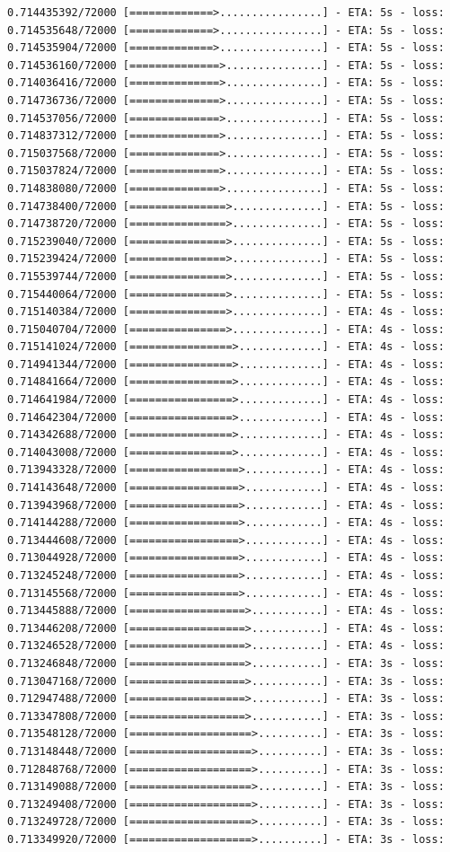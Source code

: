 \documentclass[12pt,fleqn]{article}\usepackage{../../common}
\begin{document}
\begin{verbatim}
0.714435392/72000 [=============>................] - ETA: 5s - loss: 0.714535648/72000 [=============>................] - ETA: 5s - loss: 0.714535904/72000 [=============>................] - ETA: 5s - loss: 0.714536160/72000 [==============>...............] - ETA: 5s - loss: 0.714036416/72000 [==============>...............] - ETA: 5s - loss: 0.714736736/72000 [==============>...............] - ETA: 5s - loss: 0.714537056/72000 [==============>...............] - ETA: 5s - loss: 0.714837312/72000 [==============>...............] - ETA: 5s - loss: 0.715037568/72000 [==============>...............] - ETA: 5s - loss: 0.715037824/72000 [==============>...............] - ETA: 5s - loss: 0.714838080/72000 [==============>...............] - ETA: 5s - loss: 0.714738400/72000 [===============>..............] - ETA: 5s - loss: 0.714738720/72000 [===============>..............] - ETA: 5s - loss: 0.715239040/72000 [===============>..............] - ETA: 5s - loss: 0.715239424/72000 [===============>..............] - ETA: 5s - loss: 0.715539744/72000 [===============>..............] - ETA: 5s - loss: 0.715440064/72000 [===============>..............] - ETA: 5s - loss: 0.715140384/72000 [===============>..............] - ETA: 4s - loss: 0.715040704/72000 [===============>..............] - ETA: 4s - loss: 0.715141024/72000 [================>.............] - ETA: 4s - loss: 0.714941344/72000 [================>.............] - ETA: 4s - loss: 0.714841664/72000 [================>.............] - ETA: 4s - loss: 0.714641984/72000 [================>.............] - ETA: 4s - loss: 0.714642304/72000 [================>.............] - ETA: 4s - loss: 0.714342688/72000 [================>.............] - ETA: 4s - loss: 0.714043008/72000 [================>.............] - ETA: 4s - loss: 0.713943328/72000 [=================>............] - ETA: 4s - loss: 0.714143648/72000 [=================>............] - ETA: 4s - loss: 0.713943968/72000 [=================>............] - ETA: 4s - loss: 0.714144288/72000 [=================>............] - ETA: 4s - loss: 0.713444608/72000 [=================>............] - ETA: 4s - loss: 0.713044928/72000 [=================>............] - ETA: 4s - loss: 0.713245248/72000 [=================>............] - ETA: 4s - loss: 0.713145568/72000 [=================>............] - ETA: 4s - loss: 0.713445888/72000 [==================>...........] - ETA: 4s - loss: 0.713446208/72000 [==================>...........] - ETA: 4s - loss: 0.713246528/72000 [==================>...........] - ETA: 4s - loss: 0.713246848/72000 [==================>...........] - ETA: 3s - loss: 0.713047168/72000 [==================>...........] - ETA: 3s - loss: 0.712947488/72000 [==================>...........] - ETA: 3s - loss: 0.713347808/72000 [==================>...........] - ETA: 3s - loss: 0.713548128/72000 [===================>..........] - ETA: 3s - loss: 0.713148448/72000 [===================>..........] - ETA: 3s - loss: 0.712848768/72000 [===================>..........] - ETA: 3s - loss: 0.713149088/72000 [===================>..........] - ETA: 3s - loss: 0.713249408/72000 [===================>..........] - ETA: 3s - loss: 0.713249728/72000 [===================>..........] - ETA: 3s - loss: 0.713349920/72000 [===================>..........] - ETA: 3s - loss: 
\end{verbatim}
\end{document}
